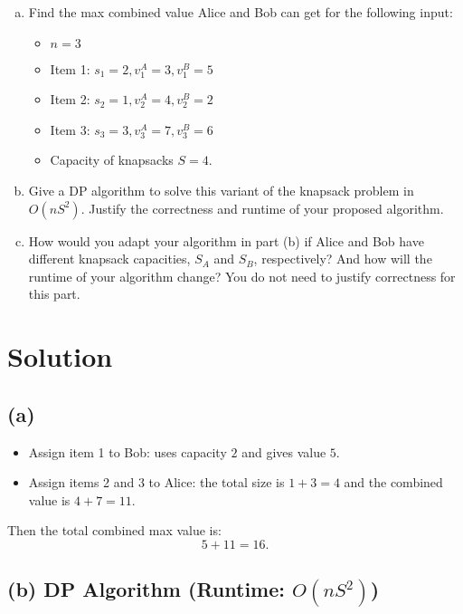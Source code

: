\documentclass[11pt]{article}
\begin{document}
\begin{tcolorbox}[title={Problem 1 (Knapsack, Take II, 50 pts)}]
        \begin{enumerate}[(a)]
            \item Find the max combined value Alice and Bob can get for the following input:
            \begin{itemize}
                \item \( n = 3 \)
                \item Item 1: \( s_1 = 2, v_1^A = 3, v_1^B = 5 \)
                \item Item 2: \( s_2 = 1, v_2^A = 4, v_2^B = 2 \)
                \item Item 3: \( s_3 = 3, v_3^A = 7, v_3^B = 6 \)
                \item Capacity of knapsacks \(S = 4\).
            \end{itemize} 
            \item Give a DP algorithm to solve this variant of the knapsack problem in $O(nS^2)$. Justify the correctness and runtime of your proposed algorithm. 
            \item How would you adapt your algorithm in part (b) if Alice and Bob have different knapsack capacities, \(S_A\) and \(S_B\), respectively? And how will the runtime of your algorithm change? You do not need to justify correctness for this part.
        \end{enumerate}
    \end{tcolorbox}

    \section*{Solution}

    \subsection*{(a)}
    \begin{itemize}
        \item Assign item 1 to Bob: uses capacity \(2\) and gives value \(5\).
        \item Assign items 2 and 3 to Alice: the total size is \(1+3=4\) and the combined value is \(4+7=11\).
    \end{itemize}
    Then the total combined max value is:
    \[
    5 + 11 = 16.
    \]
    
    \subsection*{(b) DP Algorithm (Runtime: \(O(nS^2)\))}
    
\end{document}

